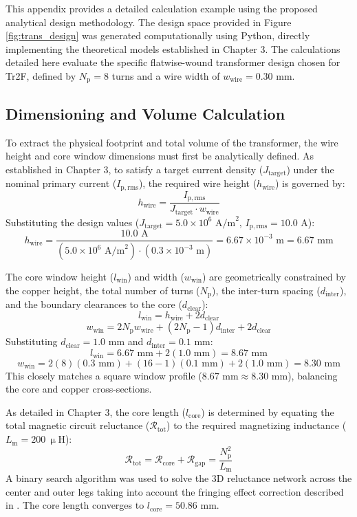 This appendix provides a detailed calculation example using the proposed analytical design methodology. The design space provided in Figure \ref{fig:trans_design} was generated computationally using Python, directly implementing the theoretical models established in Chapter 3. The calculations detailed here evaluate the specific flatwise-wound transformer design chosen for Tr2F, defined by $N_{\mathrm{p}} = 8$ turns and a wire width of $w_{\mathrm{wire}} = 0.30 \text{ mm}$.

\subsection*{Dimensioning and Volume Calculation}
To extract the physical footprint and total volume of the transformer, the wire height and core window dimensions must first be analytically defined. As established in Chapter 3, to satisfy a target current density ($J_{\mathrm{target}}$) under the nominal primary current ($I_{\mathrm{p,rms}}$), the required wire height ($h_{\mathrm{wire}}$) is governed by:
$$h_{\mathrm{wire}} = \frac{I_{\mathrm{p,rms}}}{J_{\mathrm{target}} \cdot w_{\mathrm{wire}}}$$
Substituting the design values ($J_{\mathrm{target}} = 5.0 \times 10^6 \text{ A/m}^2$, $I_{\mathrm{p,rms}} = 10.0 \text{ A}$):
$$h_{\mathrm{wire}} = \frac{10.0 \text{ A}}{(5.0 \times 10^6 \text{ A/m}^2) \cdot (0.3 \times 10^{-3} \text{ m})} = 6.67 \times 10^{-3} \text{ m} = 6.67 \text{ mm}$$

The core window height ($l_{\mathrm{win}}$) and width ($w_{\mathrm{win}}$) are geometrically constrained by the copper height, the total number of turns ($N_{\mathrm{p}}$), the inter-turn spacing ($d_{\mathrm{inter}}$), and the boundary clearances to the core ($d_{\mathrm{clear}}$):
$$l_{\mathrm{win}} = h_{\mathrm{wire}} + 2 d_{\mathrm{clear}}$$
$$w_{\mathrm{win}} = 2 N_{\mathrm{p}} w_{\mathrm{wire}} + (2 N_{\mathrm{p}} - 1) d_{\mathrm{inter}} + 2 d_{\mathrm{clear}}$$
Substituting $d_{\mathrm{clear}} = 1.0 \text{ mm}$ and $d_{\mathrm{inter}} = 0.1 \text{ mm}$:
$$l_{\mathrm{win}} = 6.67 \text{ mm} + 2 (1.0 \text{ mm}) = 8.67 \text{ mm}$$
$$w_{\mathrm{win}} = 2(8)(0.3 \text{ mm}) + (16 - 1)(0.1 \text{ mm}) + 2(1.0 \text{ mm}) = 8.30 \text{ mm}$$
This closely matches a square window profile ($8.67 \text{ mm} \approx 8.30 \text{ mm}$), balancing the core and copper cross-sections.

As detailed in Chapter 3, the core length ($l_{\mathrm{core}}$) is determined by equating the total magnetic circuit reluctance ($\mathcal{R}_{\mathrm{tot}}$) to the required magnetizing inductance ($L_{\mathrm{m}} = 200 \ \upmu\text{H}$):
$$\mathcal{R}_{\mathrm{tot}} = \mathcal{R}_{\mathrm{core}} + \mathcal{R}_{\mathrm{gap}} = \frac{N_{\mathrm{p}}^2}{L_{\mathrm{m}}}$$
A binary search algorithm was used to solve the 3D reluctance network across the center and outer legs taking into account the fringing effect correction described in \cite{muhlethaler2011novel}. The core length converges to $l_{\mathrm{core}} = 50.86 \text{ mm}$. 

